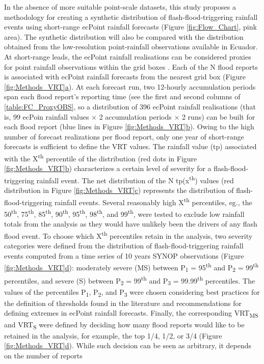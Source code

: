 \documentclass[techmemo]{ecmwfrep}%
\begin{document}
In the absence of more suitable point-scale datasets, this study proposes a methodology for creating a synthetic distribution of flash-flood-triggering rainfall events using short-range ecPoint rainfall forecasts (Figure \ref{fig:Flow_Chart}, pink area). The synthetic distribution will also be compared with the distribution obtained from the low-resolution point-rainfall observations available in Ecuador. At short-range leads, the ecPoint rainfall realisations can be considered proxies for point rainfall observations within the grid boxes \citep{Hewson2021}. Each of the N flood reports is associated with ecPoint rainfall forecasts from the nearest grid box (Figure \ref{fig:Methods_VRT}\hyperref[fig:Methods_VRT]{a}). At each forecast run, two 12-hourly accumulation periods span each flood report’s reporting time (see the first and second columns of \ref{table:FC_ProxyOBS}, so a distribution of 396 ecPoint rainfall realisations (that is, 99 ecPoin rainfall values × 2 accumulation periods × 2 runs) can be built for each flood report (blue lines in Figure \ref{fig:Methods_VRT}\hyperref[fig:Methods_VRT]{b}). Owing to the high number of forecast realizations per flood report, only one year of short-range forecasts is sufficient to define the VRT values. The rainfall value (tp) associated with the X\textsuperscript{th} percentile of the distribution (red dots in Figure \ref{fig:Methods_VRT}\hyperref[fig:Methods_VRT]{b}) characterizes a certain level of severity for a flash-flood-triggering rainfall event. The net distribution of the N tp(x\textsuperscript{th}) values (red distribution in Figure \ref{fig:Methods_VRT}\hyperref[fig:Methods_VRT]{c}) represents the distribution of flash-flood-triggering rainfall events. Several reasonably high X\textsuperscript{th} percentiles, eg., the 50\textsuperscript{th}, 75\textsuperscript{th}, 85\textsuperscript{th}, 90\textsuperscript{th}, 95\textsuperscript{th}, 98\textsuperscript{th}, and 99\textsuperscript{th}, were tested to exclude low rainfall totals from the analysis as they would have unlikely been the drivers of any flash flood event. To choose which X\textsuperscript{th} percentiles retain in the analysis, two severity categories were defined from the distribution of flash-flood-triggering rainfall events computed from a time series of 10 years SYNOP observations (Figure \ref{fig:Methods_VRT}\hyperref[fig:Methods_VRT]{d}): moderately severe (MS) between P\textsubscript{1} = 95\textsuperscript{th} and P\textsubscript{2} = 99\textsuperscript{th} percentiles, and severe (S) between P\textsubscript{2} = 99\textsuperscript{th} and P\textsubscript{3} = 99.99\textsuperscript{th} percentiles. The values of the percentiles P\textsubscript{1}, P\textsubscript{2}, and P\textsubscript{3} were chosen considering best practices for the definition of thresholds found in the literature \citep{Zsoter2020, Mitheu2023} and \cite{Hewson2021} recommendations for defining extremes in ecPoint rainfall forecasts. Finally, the corresponding VRT\textsubscript{MS} and VRT\textsubscript{S} were defined by deciding how many flood reports would like to be retained in the analysis, for example, the top 1/4, 1/2, or 3/4 (Figure \ref{fig:Methods_VRT}\hyperref[fig:Methods_VRT]{d}). While such decision can be seen as arbitrary, it depends on the number of reports 
\end{document}
